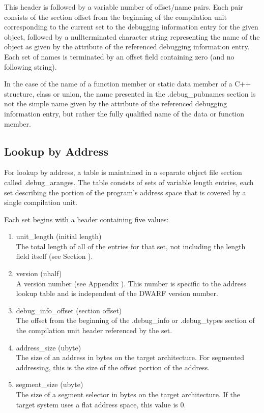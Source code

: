 This header is followed by a variable number of offset/name
pairs. Each pair consists of the section offset from the
beginning of the compilation unit corresponding to the current
set to the debugging information entry for the given object,
followed by a null\dash terminated character string representing
the name of the object as given by the  attribute
of the referenced debugging information entry. Each set of
names is terminated by an offset field containing zero (and
no following string).


In the case of the name of a function member or static data
member of a C++ structure, class or union, the name presented
in the .debug\_pubnames section is not the simple name given
by the  attribute of the referenced debugging
information entry, but rather the fully qualified name of
the data or function member.

\subsection{Lookup by Address}

For lookup by address, a table is maintained in a separate
object file section called .debug\_aranges. The table consists
of sets of variable length entries, each set describing the
portion of the program’s address space that is covered by
a single compilation unit.

Each set begins with a header containing five values:

\begin{enumerate}[1.]

\item unit\_length (initial length) \\
The total length of all of the
entries for that set, not including the length field itself
(see Section ).

\item version (uhalf) \\
A version number 
(see Appendix ). 
This
number is specific to the address lookup table and is
independent of the DWARF version number.

\item debug\_info\_offset (section offset) \\
The offset from the
beginning of the .debug\_info or .debug\_types section of the
compilation unit header referenced by the set.

\item address\_size (ubyte) \\
The size of an address in bytes on
the target architecture. For segmented addressing, this is
the size of the offset portion of the address.

\item segment\_size (ubyte) \\
The size of a segment selector in
bytes on the target architecture. If the target system uses
a flat address space, this value is 0.

\end{enumerate}


